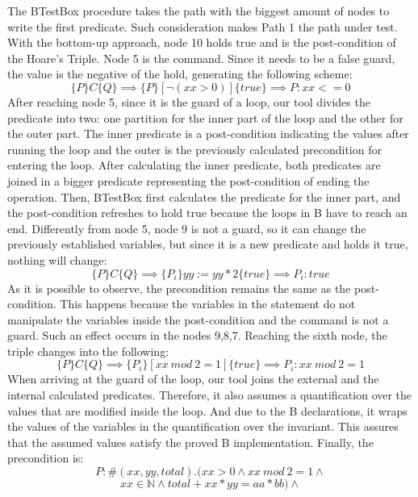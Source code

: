 \documentclass[runningheads]{llncs}
\begin{document}
The BTestBox procedure takes the path with the biggest amount of nodes to write the first predicate. Such consideration makes Path 1 the path under test. With the bottom-up approach, node 10 holds true and is the post-condition of the Hoare's Triple. Node 5 is the command. Since it needs to be a false guard, the value is the negative of the hold, generating the following scheme:
\nolinebreak[4] $$\{P\} C \{Q\} \implies \{P\} [\neg(xx > 0)] \{true\} \implies P: xx <= 0$$ \nolinebreak[4] After reaching node 5, since it is the guard of a loop, our tool divides the predicate into two: one partition for the inner part of the loop and the other for the outer part. The inner predicate is a post-condition indicating the values after running the loop and the outer is the previously calculated precondition for entering the loop. After calculating the inner predicate, both predicates are joined in a bigger predicate representing the post-condition of ending the operation. Then, BTestBox first calculates the predicate for the inner part, and the post-condition refreshes to hold true because the loops in B have to reach an end. Differently from node 5, node 9 is not a guard, so it can change the previously established variables, but since it is a new predicate and holds it true, nothing will change: \nolinebreak[4] $$\{P\} C \{Q\} \implies \{P_i\} yy := yy * 2\{true\} \implies P_i: true$$ \nolinebreak[4]
As it is possible to observe, the precondition remains the same as the post-condition. This happens because the variables in the statement do not manipulate the variables inside the post-condition and the command is not a guard. Such an effect occurs in the nodes 9,8,7. Reaching the sixth node, the triple changes into the following: \nolinebreak[4] $$\{P\} C \{Q\} \implies \{P_i\} [xx\ mod\ 2=1]\{true\} \implies P_i: xx\ mod\ 2 = 1$$ \nolinebreak[4]
When arriving at the guard of the loop, our tool joins the external and the internal calculated predicates. Therefore, it also assumes a quantification over the values that are modified inside the loop. And due to the B declarations, it wraps the values of the variables in the quantification over the invariant. This assures that the assumed values satisfy the proved B implementation. Finally, the precondition is: \nolinebreak[4]
$$P: \#(xx, yy, total).(xx > 0 \wedge xx\ mod\ 2 = 1 \wedge$$
$$ xx \in \mathbb{N} \wedge total + xx * yy = aa * bb) \wedge$$
\end{document}
